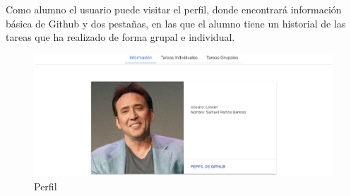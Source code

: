 Como alumno el usuario puede visitar el perfil, donde encontrará información básica de Github y dos pestañas, en las que el alumno tiene un historial de las tareas que ha realizado de forma grupal e individual.

\begin{figure}[!th]
\begin{center}
\includegraphics[scale=0.5]{images/profile}
\caption{Perfil}
\label{fig:Perfil}
\end{center}
\end{figure}

